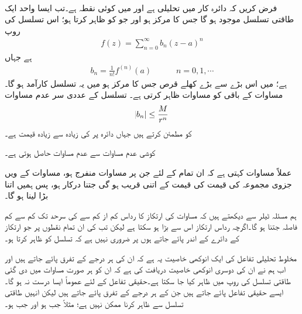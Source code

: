 \quad {}\\
فرض کریں کہ دائرہ کار  میں  تحلیلی ہے اور  میں  کوئی نقطہ ہے۔تب ایسا واحد ایک طاقتی تسلسل موجود ہو گا جس کا مرکز  ہو اور جو  کو ظاہر کرتا ہو؛ اس تسلسل کی روپ
\begin{align}\label{مساوات_ٹیلر_ٹیلر_تسلسل}
f(z)=\sum\limits_{n=0}^{\infty} b_n(z-a)^n
\end{align}
ہے جہاں
\begin{align*}
b_n=\frac{1}{n!}f^{(n)}(a)\quad \quad \quad n=0,1,\cdots
\end{align*}
ہے؛ میں اس بڑے سے بڑے کھلے قرص جس کا مرکز  ہو میں یہ تسلسل کارآمد ہو گا۔مساوات  کے باقی  کو  مساوات  ظاہر کرتی ہے۔ تسلسل کے عددی سر  عدم مساوات 
\begin{align}\label{مساوات_ٹیلر_ٹیلر_عددی_سر_عدم_مساوات}
\abs{b_n}\le \frac{M}{r^n}
\end{align}
کو مطمئن کرتے ہیں جہاں دائرہ  پر  کی زیادہ سے زیادہ قیمت  ہے۔ 

کوشی عدم مساوات  سے عدم مساوات   حاصل ہوتی ہے۔

عملاً مساوات  کہتی ہے کہ ان تمام  کے لئے جن پر مساوات  منفرج ہو، مساوات  کے  ویں جزوی مجموعہ کی قیمت  کی قیمت کے اتنی قریب ہو گی جتنا درکار ہو، پس ہمیں  اتنا بڑا لینا ہو گا۔

ہم مسئلہ ٹیلر سے دیکھتے ہیں کہ مساوات  کی ارتکاز کا رداس کم از کم  سے  کی سرحد تک کم سے کم فاصلہ جتنا ہو گا۔اگرچہ رداس  ارتکاز اس سے بڑا ہو سکتا ہے لیکن تب  کی ان تمام نقطوں پر جو ارتکاز کے دائرے کے اندر  پائے جاتے ہوں پر ضروری نہیں ہے کہ تسلسل  کو ظاہر کرتا ہو۔ 

مخلوط تحلیلی تفاعل کی ایک انوکھی خاصیت یہ ہے کہ ان کی ہر درجے کے تفرق پائے جاتے ہیں اور اب ہم نے ان کی دوسری انوکھی خاصیت دریافت کی ہے کہ ان کو ہر صورت مساوات  میں دی گئی طاقتی تسلسل کی روپ میں ظاہر کیا جا سکتا ہے۔حقیقی تفاعل کے لئے عموماً ایسا درست نہ ہو گا۔ایسے حقیقی تفاعل پائے جاتے ہیں جن کے ہر درجے کے تفرق پائے جاتے ہیں لیکن انہیں طاقتی تسلسل سے ظاہر کرنا ممکن نہیں ہے؛ مثلاً  جب  ہو اور  جب  ہو۔

